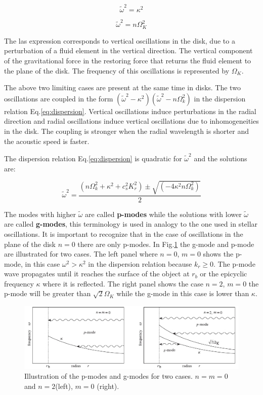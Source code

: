 \begin{equation}
\tilde{\omega}^2 = \kappa^2
\end{equation}

\begin{equation}
\tilde{\omega}^2 = n \Omega_K^2
\end{equation}

The las expression corresponds to vertical oscillations in the disk, due to a
perturbation of a fluid element in the vertical direction. The
vertical component of the gravitational force in the restoring force
that returns the fluid element to the plane of the disk. The frequency
of this oscillations is represented by $\Omega_K$.


The above two limiting cases are present at the same time in disks.
The two oscillations are coupled in the form $(\tilde{\omega}^2 -
\kappa^2)(\tilde{\omega}^2 - n\Omega_k^2)$ in the dispersion relation
Eq.\ref{eq:dispersion}. Vertical oscillations induce perturbations
in the radial direction and radial oscillations induce vertical
oscillations due to inhomogeneities in the disk. The
coupling is stronger when the radial wavelength is shorter and the
acoustic speed is faster.

The dispersion relation Eq.\ref{eq:dispersion} is quadratic for
$\tilde{\omega}^2$ and the solutions are:

\begin{equation}\label{eq:sol}
\tilde{\omega}^2 = \dfrac{(n\Omega_k^2 + \kappa^2 + c_s^2 K_r^2) \pm
\sqrt{( - 4\kappa^2n\Omega_k^2)}}{2}
\end{equation}

The modes with higher $\tilde{\omega}$ are called \textbf{p-modes} 
while the solutions with lower $\tilde{\omega}$ are called
\textbf{g-modes}, this terminology is used in analogy to the one used
in stellar oscillations. It is important to recognize that in the case
of oscillations in the plane of the disk $n=0$ there are only p-modes.
In Fig.\ref{fig:gpmodes} the g-mode and p-mode are illustrated for two
cases. The left panel where $n=0$, $m=0$ shows the p-mode, in this case
$\omega^2 > \kappa^2$ in the dispersion relation because
$k_r \geq 0$. The p-mode wave propagates until it reaches the
surface of the object at $r_b$ or the epicyclic frequency $\kappa$
where it is reflected. The right panel shows the case $n=2$, $m=0$
the p-mode will be greater than $\sqrt{2}\Omega_K$ while the g-mode in
this case is lower than $\kappa$.

\begin{figure}\label{fig:gpmodes}
\centering
\includegraphics[scale=0.5]{waves.png}
\caption{Illustration of the p-modes and g-modes for two cases.
$n=m=0$ and $n=2$(left), $m=0$ (right).}
\end{figure}



